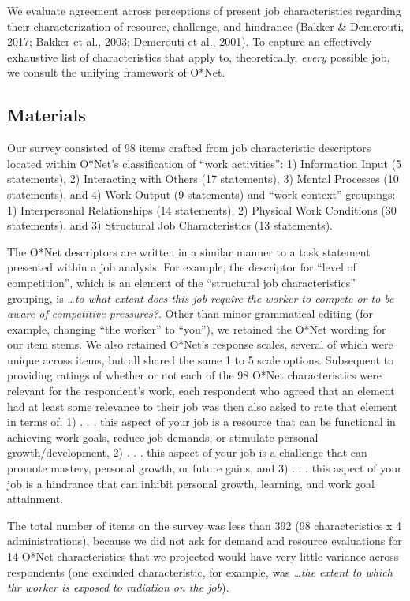 \documentclass[
  man]{apa6}
\begin{document}
We evaluate agreement across perceptions of present job characteristics regarding their characterization of resource, challenge, and hindrance (Bakker \& Demerouti, 2017; Bakker et al., 2003; Demerouti et al., 2001). To capture an effectively exhaustive list of characteristics that apply to, theoretically, \emph{every} possible job, we consult the unifying framework of O*Net.

\hypertarget{materials}{%
\subsection{Materials}\label{materials}}

Our survey consisted of 98 items crafted from job characteristic descriptors located within O*Net's classification of ``work activities'': 1) Information Input (5 statements), 2) Interacting with Others (17 statements), 3) Mental Processes (10 statements), and 4) Work Output (9 statements) and ``work context'' groupings: 1) Interpersonal Relationships (14 statements), 2) Physical Work Conditions (30 statements), and 3) Structural Job Characteristics (13 statements).

The O*Net descriptors are written in a similar manner to a task statement presented within a job analysis. For example, the descriptor for ``level of competition'', which is an element of the ``structural job characteristics'' grouping, is \emph{\ldots to what extent does this job require the worker to compete or to be aware of competitive pressures?}. Other than minor grammatical editing (for example, changing ``the worker'' to ``you''), we retained the O*Net wording for our item stems. We also retained O*Net's response scales, several of which were unique across items, but all shared the same 1 to 5 scale options. Subsequent to providing ratings of whether or not each of the 98 O*Net characteristics were relevant for the respondent's work, each respondent who agreed that an element had at least some relevance to their job was then also asked to rate that element in terms of, 1) . . . this aspect of your job is a resource that can be functional in achieving work goals, reduce job demands, or stimulate personal growth/development, 2) . . . this aspect of your job is a challenge that can promote mastery, personal growth, or future gains, and 3) . . . this aspect of your job is a hindrance that can inhibit personal growth, learning, and work goal attainment.

The total number of items on the survey was less than 392 (98 characteristics x 4 administrations), because we did not ask for demand and resource evaluations for 14 O*Net characteristics that we projected would have very little variance across respondents (one excluded characteristic, for example, was \emph{\ldots the extent to which thr worker is exposed to radiation on the job}).
\end{document}

